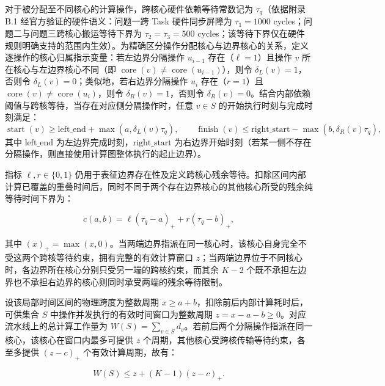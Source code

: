 \documentclass[anonymous,notoc]{gmcm2026}
\begin{document}
对于被分配至不同核心的计算操作，跨核心硬件依赖等待常数记为 \(\tau_q\)（依据附录 B.1 经官方验证的硬件语义：问题一跨 Task 硬件同步屏障为 \(\tau_1 = 1000\) cycles；问题二与问题三跨核心搬运等待下界为 \(\tau_2 = \tau_3 = 500\) cycles；该等待下界仅在硬件规则明确支持的范围内生效）。为精确区分操作分配核心与边界核心的关系，定义逐操作的核心归属指示变量：若左边界分隔操作 \(u_{i-1}\) 存在（\(\ell = 1\)）且操作 \(v\) 所在核心与左边界核心不同（即 \(\operatorname{core}(v) \ne \operatorname{core}(u_{i-1})\)），则令 \(\delta_L(v) = 1\)，否则令 \(\delta_L(v) = 0\)；类似地，若右边界分隔操作 \(u_i\) 存在（\(r = 1\)）且 \(\operatorname{core}(v) \ne \operatorname{core}(u_i)\)，则令 \(\delta_R(v) = 1\)，否则令 \(\delta_R(v) = 0\)。结合内部依赖阈值与跨核等待，当存在对应侧分隔操作时，任意 \(v \in S\) 的开始执行时刻与完成时刻满足： \begin{equation}
\operatorname{start}(v) \ge \text{left\_end} + \max(a, \delta_L(v) \tau_q), \qquad \operatorname{finish}(v) \le \text{right\_start} - \max(b, \delta_R(v) \tau_q),
\end{equation} 其中 \(\text{left\_end}\) 为左边界完成时刻，\(\text{right\_start}\) 为右边界开始时刻（若某一侧不存在分隔操作，则直接使用计算图整体执行的起止边界）。

指标 \(\ell, r \in \{0, 1\}\) 仍用于表征边界存在性及定义跨核心残余等待。扣除区间内部计算已覆盖的重叠时间后，同时不同于两个存在边界核心的其他核心所受的残余纯等待时间下界为：

\begin{equation}
c(a,b) = \ell(\tau_q - a)_+ + r(\tau_q - b)_+,
\end{equation}

其中 \((x)_+ = \max(x, 0)\)。当两端边界指派在同一核心时，该核心自身完全不受这两个跨核等待约束，拥有完整的有效计算窗口 \(z\)；当两端边界位于不同核心时，各边界所在核心分别只受另一端的跨核约束，而其余 \(K - 2\) 个既不承担左边界也不承担右边界的核心则同时承受两端的残余等待限制。

设该局部时间区间的物理跨度为整数周期 \(x \ge a + b\)，扣除前后内部计算耗时后，可供集合 \(S\) 中操作并发执行的有效时间窗口为整数周期 \(z = x - a - b \ge 0\)。对应流水线上的总计算工作量为 \(W(S) = \sum_{v \in S} d_v\)。若前后两个分隔操作指派在同一核心，该核心在窗口内最多可提供 \(z\) 个周期，其他核心受跨核传输等待约束，各至多提供 \((z - c)_+\) 个有效计算周期，故有：

\begin{equation}
W(S) \le z + (K - 1)(z - c)_+.
\end{equation}
\end{document}
